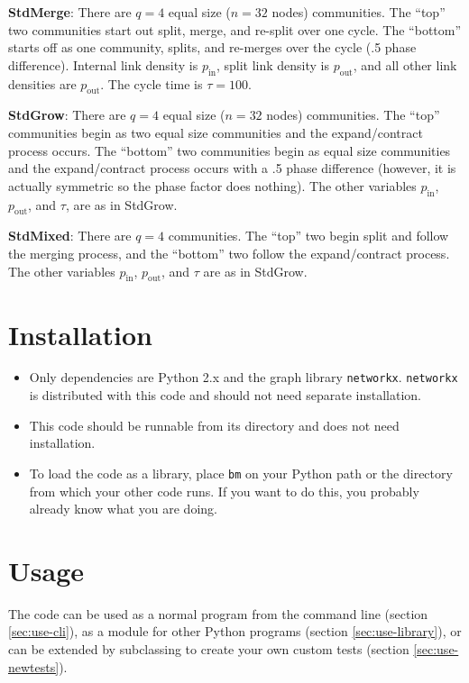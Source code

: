 \documentclass{article}
\def\pin{p_\mathrm{in}}
\def\pout{p_\mathrm{out}}
\begin{document}
\textbf{StdMerge}: There are $q=4$ equal size ($n=32$ nodes)
communities.  The ``top'' two communities start out split, merge, and
re-split over one cycle.  The ``bottom'' starts off as one community,
splits, and re-merges over the cycle (.5 phase difference).  Internal
link density is $\pin$, split link density is $\pout$, and all other
link densities are $\pout$.  The cycle time is $\tau=100$.

\textbf{StdGrow}: There are $q=4$ equal size ($n=32$ nodes)
communities.  The ``top'' communities begin as two equal size
communities and the expand/contract process occurs.  The ``bottom''
two communities begin as equal size communities and the
expand/contract process occurs with a .5 phase difference (however,
it is actually symmetric so the phase factor does nothing).  The other
variables $\pin$, $\pout$, and $\tau$, are as in StdGrow.

\textbf{StdMixed}: There are $q=4$ communities.  The ``top'' two begin
split and follow the merging process, and the ``bottom'' two follow
the expand/contract process.  The other variables $\pin$, $\pout$, and
$\tau$ are as in StdGrow.





\section{Installation}


\begin{itemize}
\item Only dependencies are Python 2.x and the graph library
  \texttt{networkx}.  \texttt{networkx} is distributed with this code
  and should not need separate installation.
\item This code should be runnable from its directory and does not
  need installation.
\item To load the code as a library, place \texttt{bm} on your Python
  path or the directory from which your other code runs.  If you want
  to do this, you probably already know what you are doing.
\end{itemize}





\section{Usage}

The code can be used as a normal program from the command line
(section \ref{sec:use-cli}), as a module for other Python programs
(section \ref{sec:use-library}), or can be extended by subclassing to
create your own custom tests (section \ref{sec:use-newtests}).
\end{document}
